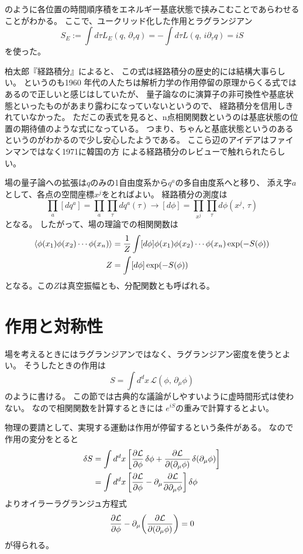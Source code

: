 \documentclass[../../master.tex]{subfiles}
\begin{document}
のように各位置の時間順序積をエネルギー基底状態で挟みこむことであらわせることがわかる。
ここで、ユークリッド化した作用とラグランジアン
\begin{equation}
    S_E := \int d\tau L_E(q,\,\partial_\tau q) = - \int d\tau L(q,\,i\partial_\tau q) = i S
\end{equation}
を使った。

柏太郎『経路積分』\cite{book:kashiwa-taro_2015}によると、
この式は経路積分の歴史的には結構大事らしい。
というのも1960 年代の人たちは解析力学の作用停留の原理からくる式ではあるので正しいと感じはしていたが、
量子論なのに演算子の非可換性や基底状態といったものがあまり露わになっていないというので、
経路積分を信用しきれていなかった。
ただこの表式を見ると、n点相関関数というのは基底状態の位置の期待値のような式になっている。
つまり、ちゃんと基底状態というのあるというのがわかるので少し安心したようである。
ここら辺のアイデアはファインマンではなく1971に韓国の方 %
による経路積分のレビューで触れられたらしい。 %

場の量子論への拡張は\(q\)のみの1自由度系から\(q^a\)の多自由度系へと移り、
添え字\(a\)として、各点の空間座標\(x^j\)をとればよい。
経路積分の測度は
\begin{equation}
    \prod_a [dq^a] = \prod_{a}\prod_{\tau} dq^a(\tau) \rightarrow [d\phi] = \prod_{x^j}\prod_{\tau}d\phi(x^j,\,\tau)
\end{equation}
となる。
したがって、場の理論での相関関数は
\begin{align}
    \ev{\phi(x_1)\phi(x_2)\cdots\phi(x_n)}
    &= \frac{1}{Z} \int[d\phi] \phi(x_1)\phi(x_2)\cdots\phi(x_n) \exp(-S(\phi))\\
    Z
    &= \int[d\phi] \exp(-S(\phi))
\end{align}
となる。この\(Z\)は真空振幅とも、分配関数とも呼ばれる。

\section{作用と対称性}
場を考えるときにはラグランジアンではなく、ラグランジアン密度を使うとよい。
そうしたときの作用は
\begin{equation}
    S = \int d^dx\, \mathcal{L}(\phi,\,\partial_\mu \phi)
\end{equation}
のように書ける。
この節では古典的な議論がしやすいように虚時間形式は使わない。
なので相関関数を計算するときには
\(e^{iS}\)の重みで計算するとよい。

物理の要請として、実現する運動は作用が停留するという条件がある。
なので作用の変分をとると
\begin{align}
    \var{S}
    &= \int d^d x\, \qty[\pdv{\mathcal{L}}{\phi}\var{\phi}+\pdv{\mathcal{L}}{(\partial_\mu \phi)}\var(\partial_\mu \phi)] \notag\\
    &= \int d^d x\, \qty[\pdv{\mathcal{L}}{\phi}-\partial_\mu\pdv{\mathcal{L}}{\partial_\mu \phi}]\var{\phi}
\end{align}
よりオイラーラグランジュ方程式
\begin{equation}
    \pdv{\mathcal{L}}{\phi}-\partial_\mu\qty(\pdv{\mathcal{L}}{(\partial_\mu \phi)}) = 0
\end{equation}
が得られる。
\end{document}
